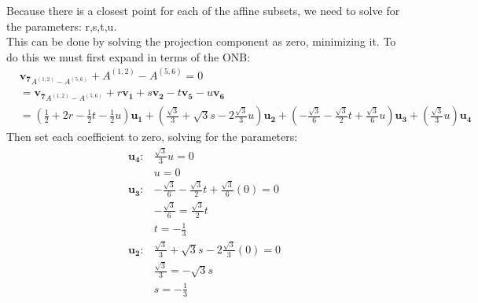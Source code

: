 \documentclass[12pt]{article}
\begin{document}
\begin{enumerate}
\begin{enumerate}
                    Because there is a closest point for each of the affine subsets, we need to solve for the parameters: r,s,t,u. \\
                    This can be done by solving the projection component as zero, minimizing it.
                    To do this we must first expand in terms of the ONB:
                    \begin{align*}
                         & \mathbf{\mathbf{v_7}}_{A^{(1,2)}-A^{(5,6)}} + A^{(1,2)} - A^{(5,6)} = 0                                       \\
                         & = \mathbf{\mathbf{v_7}}_{A^{(1,2)}-A^{(5,6)}} + r\mathbf{v_1} + s\mathbf{v_2} - t\mathbf{v_5} - u\mathbf{v_6} \\
                         & = (\tfrac{1}{2} + 2r - \tfrac{1}{2}t - \tfrac{1}{2}u) \mathbf{u_1}
                        + (\tfrac{\sqrt{3}}{3} + \sqrt{3}s - 2\tfrac{\sqrt{3}}{3}u) \mathbf{u_2}
                        + (-\tfrac{\sqrt{3}}{6} - \tfrac{\sqrt{3}}{2}t + \tfrac{\sqrt{3}}{6}u) \mathbf{u_3}
                        + (\tfrac{\sqrt{3}}{3}u) \mathbf{u_4}
                    \end{align*}
                    Then set each coefficient to zero, solving for the parameters:
                    \begin{align*}
                        \mathbf{u_4}: & \tfrac{\sqrt{3}}{3}u = 0                                                 \\
                                      & u = 0                                                                    \\
                        \mathbf{u_3}: & -\tfrac{\sqrt{3}}{6} - \tfrac{\sqrt{3}}{2}t + \tfrac{\sqrt{3}}{6}(0) = 0 \\
                                      & -\tfrac{\sqrt{3}}{6} = \tfrac{\sqrt{3}}{2}t                              \\
                                      & t = -\tfrac{1}{3}                                                        \\
                        \mathbf{u_2}: & \tfrac{\sqrt{3}}{3} + \sqrt{3}s - 2\tfrac{\sqrt{3}}{3}(0)=0              \\
                                      & \tfrac{\sqrt{3}}{3} = -\sqrt{3}s                                         \\
                                      & s = -\tfrac{1}{3}                                                        \\

\end{align*}
\end{enumerate}
\end{enumerate}
\end{document}
